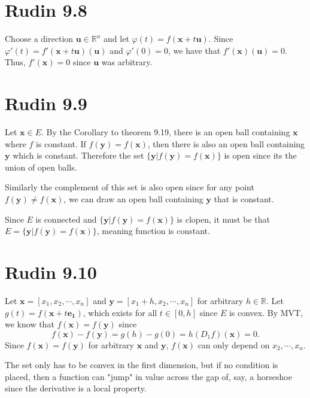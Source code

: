 \documentclass{article}
\begin{document}
\section*{Rudin 9.8}
Choose a direction $\bm{u} \in \mathbb{R}^n$ and
let $\varphi(t) = f(\bm{x} + t\bm{u})$.
Since $\varphi'(t) = f'(\bm{x} + t\bm{u})(\bm{u})$ and $\varphi'(0) = 0$,
we have that $f'(\bm{x})(\bm{u}) = 0$. Thus, $f'(\bm{x}) = 0$
since $\bm{u}$ was arbitrary.

\newpage 

\section*{Rudin 9.9}
Let $\bm{x} \in E$.
By the Corollary to theorem 9.19,
there is an open ball containing $\bm{x}$
where $f$ is constant. 
If $f(\bm{y}) = f(\bm{x})$, then there is also 
an open ball containing $\bm{y}$ which is constant.
Therefore the set $\{\bm{y} | f(\bm{y}) = f(\bm{x})\}$
is open since its the union of open balls. 

Similarly the complement of this set is also open since for any point
$f(\bm{y}) \neq f(\bm{x})$, we can draw an open ball containing 
$\bm{y}$ that is constant. 

Since $E$ is connected and $\{\bm{y} | f(\bm{y}) = f(\bm{x})\}$
is clopen, it must be that $E = \{\bm{y} | f(\bm{y}) = f(\bm{x})\}$,
meaning function is constant.
\newpage

\section*{Rudin 9.10}

Let $\bm{x} = [x_1, x_2, \cdots , x_n]$
and $\bm{y} = [x_1+h, x_2, \cdots , x_n]$ for arbitrary $h \in \mathbb{R}$.
Let $g(t) = f(\bm{x} + t\bm{e_1})$, which exists
for all $t \in [0, h]$ since  $E$ is convex.
By MVT, we know that $f(\bm{x}) = f(\bm{y})$ since
\[
  f(\bm{x}) - f(\bm{y}) = g(h) - g(0) = h (D_1 f)(\bm{x}) = 0.
\]
Since $f(\bm{x}) = f(\bm{y})$ for arbitrary $\bm{x}$ and $\bm{y}$,
$f(\bm{x})$ can only depend on $x_2, \cdots , x_n$.

The set only has to be convex in the first dimension,
but if no condition is placed, then a function can "jump"
in value across the gap of, say, a horseshoe since 
the derivative is a local property.

\newpage
\end{document}
